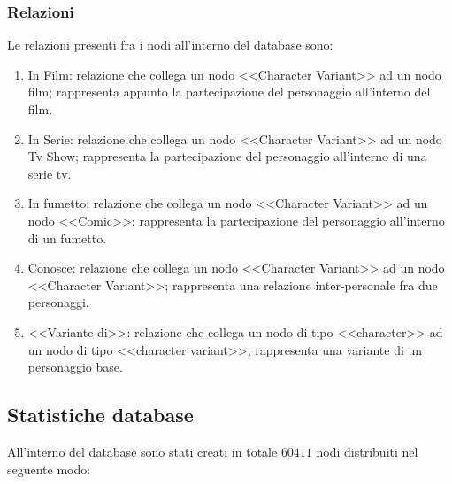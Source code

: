 \documentclass[
12pt, %
a4paper, %
oneside, %
headinclude,footinclude, %
BCOR5mm, %
]{scrartcl}
\begin{document}
\subsubsection{Relazioni}
Le relazioni presenti fra i nodi all'interno del database sono:
\begin{enumerate}
	\item In Film: relazione che collega un nodo <<Character Variant>> ad un nodo film; rappresenta appunto la partecipazione del personaggio all'interno del film.
	\item In Serie: relazione che collega un nodo <<Character Variant>> ad un nodo Tv Show; rappresenta la partecipazione del personaggio all'interno di una serie tv.
	\item In fumetto: relazione che collega un nodo <<Character Variant>> ad un nodo <<Comic>>; rappresenta la partecipazione del personaggio all'interno di un fumetto.
	\item Conosce: relazione che collega un nodo <<Character Variant>> ad un nodo <<Character Variant>>; rappresenta una relazione inter-personale fra due personaggi.
	\item <<Variante di>>: relazione che collega un nodo di tipo <<character>> ad un nodo di tipo <<character variant>>; rappresenta una variante di un personaggio base.
\end{enumerate}

\subsection{Statistiche database}
All'interno del database sono stati creati in totale $60411$ nodi distribuiti nel seguente modo: 
\end{document}
